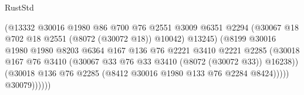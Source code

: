 \begin{lexlean}{RustStd}
\begin{coremodule}
{\begin{coremodule}
{{{{{{{{{{{{{{{{{{{{{{{{{{{{{{{{{{{{{{{{{{{{{{{{{{{{{                                            (@13332
                                              @30016
                                              @1980
                                              @86
                                              @700
                                              @76
                                              @2551
                                              @3009
                                              @6351
                                              @2294
                                              (@30067
                                                @18
                                                @702
                                                @18
                                                @2551
                                                (@8072 (@30072 @18))
                                                @10042)
                                              @13245)
                                            (@8199
                                              @30016
                                              @1980
                                              @1980
                                              @8203
                                              @6364
                                              @167
                                              @136
                                              @76
                                              @2221
                                              @3410
                                              @2221
                                              @2285
                                              (@30018
                                                @167
                                                @76
                                                @3410
                                                (@30067
                                                  @33
                                                  @76
                                                  @33
                                                  @3410
                                                  (@8072 (@30072 @33))
                                                  @16238))
                                              (@30018
                                                @136
                                                @76
                                                @2285
                                                (@8412 @30016 @1980 @133 @76 @2284 @8424)))))
                                        @30079))))))
}}}}}}}}}}}}}}}}}}}}}}}}}}}}}}}}}}}}}}}}}}}}}}}}}}}}}
\end{coremodule}}
\end{coremodule}
\end{lexlean}
